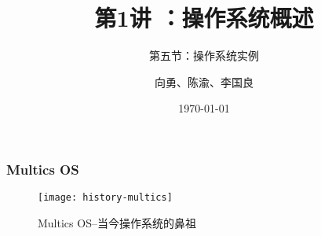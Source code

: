 


\title[第1讲]{第1讲 ：操作系统概述} %
\subtitle{第五节：操作系统实例}
\author{向勇、陈渝、李国良} %
\date{\today} %



\begin{frame}
\titlepage %
\end{frame}

%
%

\begin{frame}
	\frametitle{Multics OS}
	
	\begin{figure}
		\centering
		\texttt{[image: history-multics]}
		\caption{Multics OS--当今操作系统的鼻祖}
	\end{figure}
	
\end{frame}

